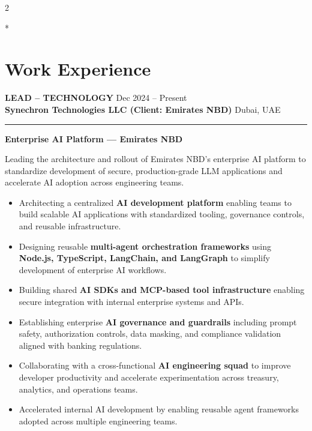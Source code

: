 \documentclass[10pt,a4paper]{article}
\newcommand{\roleheader}[4]{%
  \noindent
  \textbf{\MakeUppercase{#3}}%
  \hfill
  \textcolor{secondary}{#4}\\[0pt]

  \noindent
  \textbf{#1}%
  \hfill
  \textcolor{secondary}{#2}\\[0pt]
}
\newcommand{\roledivider}{%
  \vspace{-1pt}%
  {\color{rulecolor}\rule{\linewidth}{0.5pt}}%
  \vspace{2pt}%
}
\newcommand{\projecttitle}[1]{\textbf{#1}\par\vspace{2pt}}
\begin{document}
\begin{paracol}{2}

\switchcolumn[0]*
\section*{Work Experience}

\roleheader{Synechron Technologies LLC (Client: Emirates NBD)}{Dubai, UAE}{Lead -- Technology}{Dec 2024 -- Present}
\roledivider

\projecttitle{Enterprise AI Platform — Emirates NBD}

Leading the architecture and rollout of Emirates NBD’s enterprise AI platform to standardize development of secure, production-grade LLM applications and accelerate AI adoption across engineering teams.

\begin{itemize}

\item Architecting a centralized \textbf{AI development platform} enabling teams to build scalable AI applications with standardized tooling, governance controls, and reusable infrastructure.

\item Designing reusable \textbf{multi-agent orchestration frameworks} using \textbf{Node.js, TypeScript, LangChain, and LangGraph} to simplify development of enterprise AI workflows.

\item Building shared \textbf{AI SDKs and MCP-based tool infrastructure} enabling secure integration with internal enterprise systems and APIs.

\item Establishing enterprise \textbf{AI governance and guardrails} including prompt safety, authorization controls, data masking, and compliance validation aligned with banking regulations.

\item Collaborating with a cross-functional \textbf{AI engineering squad} to improve developer productivity and accelerate experimentation across treasury, analytics, and operations teams.

\item Accelerated internal AI development by enabling reusable agent frameworks adopted across multiple engineering teams.


\end{itemize}
\end{paracol}
\end{document}
